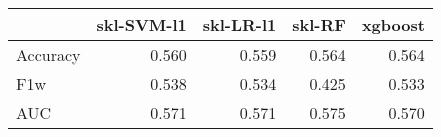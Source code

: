 \begin{tabular}{lrrrr}
\toprule
{} &  skl-SVM-l1 &  skl-LR-l1 &  skl-RF &  xgboost \\
\midrule
Accuracy &       0.560 &      0.559 &   0.564 &    0.564 \\
F1w      &       0.538 &      0.534 &   0.425 &    0.533 \\
AUC      &       0.571 &      0.571 &   0.575 &    0.570 \\
\bottomrule
\end{tabular}
